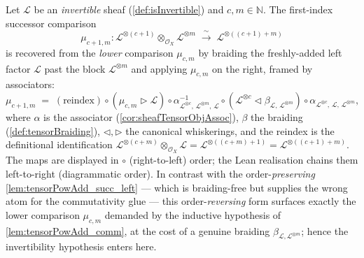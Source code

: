 \begin{lemma}
  \label{lem:tensorPowAdd_succ_left_braided}
  Let \(\mathcal{L}\) be an \emph{invertible} sheaf (\cref{def:isInvertible}) and
  \(c, m \in \mathbb{N}\). The first-index successor comparison
  \[
    \mu_{c+1,m} : \mathcal{L}^{\otimes(c+1)} \otimes_{\mathcal{O}_X}
      \mathcal{L}^{\otimes m} \;\xrightarrow{\ \sim\ }\;
      \mathcal{L}^{\otimes((c+1)+m)}
  \]
  is recovered from the \emph{lower} comparison \(\mu_{c,m}\) by braiding the
  freshly-added left factor \(\mathcal{L}\) past the block \(\mathcal{L}^{\otimes
  m}\) and applying \(\mu_{c,m}\) on the right, framed by associators:
  \[
    \mu_{c+1,m}
      \;=\;
      (\text{reindex})\circ
      (\mu_{c,m} \rhd \mathcal{L})\circ
      \alpha^{-1}_{\mathcal{L}^{\otimes c},\,\mathcal{L}^{\otimes m},\,\mathcal{L}}\circ
      (\mathcal{L}^{\otimes c} \lhd \beta_{\mathcal{L},\,\mathcal{L}^{\otimes m}})\circ
      \alpha_{\mathcal{L}^{\otimes c},\,\mathcal{L},\,\mathcal{L}^{\otimes m}},
  \]
  where \(\alpha\) is the associator (\cref{cor:sheafTensorObjAssoc}), \(\beta\)
  the braiding (\cref{def:tensorBraiding}), \(\lhd,\rhd\) the canonical
  whiskerings, and the reindex is the definitional identification
  \(\mathcal{L}^{\otimes(c+m)}\otimes_{\mathcal{O}_X}\mathcal{L} =
  \mathcal{L}^{\otimes((c+m)+1)} = \mathcal{L}^{\otimes((c+1)+m)}\). The maps are
  displayed in \(\circ\) (right-to-left) order; the Lean realisation chains them
  left-to-right (diagrammatic order). In contrast with the
  order-\emph{preserving} \cref{lem:tensorPowAdd_succ_left} --- which is
  braiding-free but supplies the wrong atom for the commutativity glue --- this
  order-\emph{reversing} form surfaces exactly the lower comparison \(\mu_{c,m}\)
  demanded by the inductive hypothesis of \cref{lem:tensorPowAdd_comm}, at the
  cost of a genuine braiding \(\beta_{\mathcal{L},\mathcal{L}^{\otimes m}}\);
  hence the invertibility hypothesis enters here.
\end{lemma}

